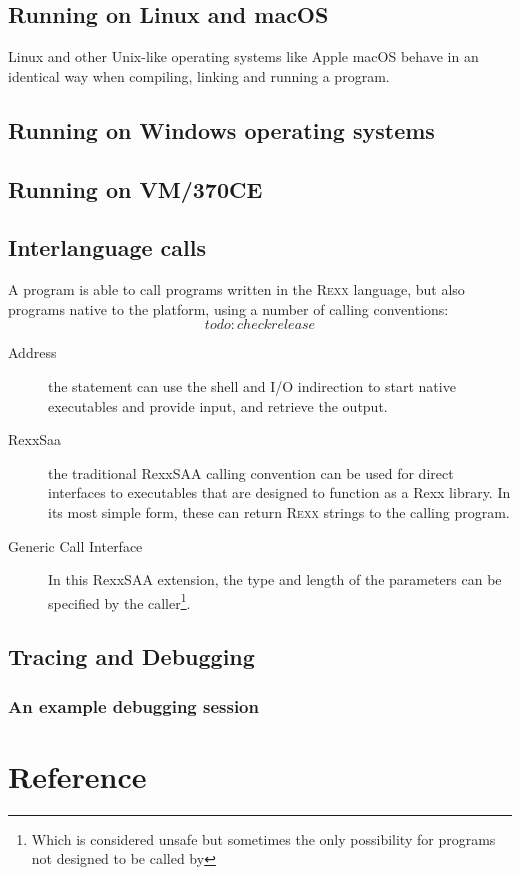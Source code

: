 \chapter{Running \crexx{} on Linux and macOS}
Linux and other Unix-like operating systems like Apple macOS behave in
an identical way when compiling, linking and running a \crexx{}
program.

\chapter{Running \crexx{} on Windows operating systems}
\chapter{Running \crexx{} on VM/370CE}
\chapter{Interlanguage calls}
A \crexx{} program is able to call programs written in the \textsc{Rexx}
language, but also programs native to the platform, using a number of
calling conventions: \[todo: checkrelease\]
\begin{description}
  \item[Address] the  statement can use the shell and
    I/O indirection to start native executables and provide input, and
    retrieve the output.
    \item[RexxSaa] the traditional RexxSAA calling convention can be
      used for direct interfaces to executables that are designed to
      function as a Rexx library. In its most simple form, these can
      return \textsc{Rexx} strings to the calling program.
      \item[Generic Call Interface] In this RexxSAA extension, the
      type and length of the parameters can be specified by the
      caller\footnote{Which is considered unsafe but sometimes the
        only possibility for programs not designed to be called by \crexx{}}.
    \end{description}
    \chapter{Tracing and Debugging}
    \section{An example debugging session}
\part{Reference}
